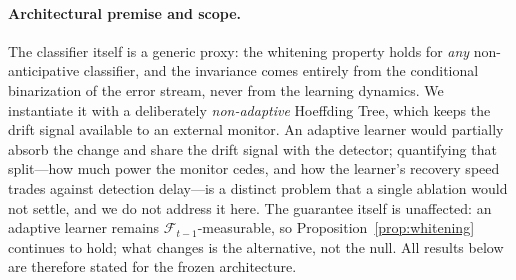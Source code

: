 \documentclass[sigconf,anonymous,review]{acmart}
\theoremstyle{acmdefinition}
\begin{document}
\paragraph{Architectural premise and scope.}
The classifier itself is a generic proxy: the whitening property holds for \emph{any} non-anticipative classifier, and the invariance comes entirely from the conditional binarization of the error stream, never from the learning dynamics. We instantiate it with a deliberately \emph{non-adaptive} Hoeffding Tree, which keeps the drift signal available to an external monitor.
An adaptive learner would partially absorb the change and share the drift signal with the detector; quantifying that split---how much power the monitor cedes, and how the learner's recovery speed trades against detection delay---is a distinct problem that a single ablation would not settle, and we do not address it here.
The guarantee itself is unaffected: an adaptive learner remains $\mathcal{F}_{t-1}$-measurable, so Proposition~\ref{prop:whitening} continues to hold; what changes is the alternative, not the null. All results below are therefore stated for the frozen architecture.
\end{document}
